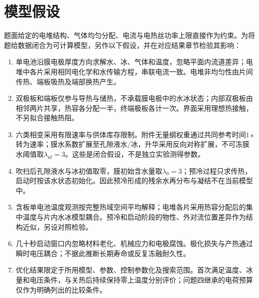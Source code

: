 \documentclass[bwprint]{gmcmthesis}
\numberwithin{equation}{section}
\numberwithin{figure}{section}
\begin{document}
\section{模型假设}
题面给定的电堆结构、气体均匀分配、电流与电热丝功率上限直接作为约束。为将题给数据闭合为可计算模型，另作以下假设，并在对应结果章节检验其影响：
\begin{enumerate}
\item 单电池沿膜电极厚度方向求解水、冰、气体和温度，忽略平面内流道差异；电堆中各片采用相同电化学和水传输方程，串联电流一致。电堆非均匀性由片间传热、端板吸热及端部换热产生。
\item 双极板和端板仅参与导热与储热，不承载膜电极中的水冰状态；内部双极板由相邻两片共享，热容各分配一半，终端极板各计一次。界面采用理想热接触，不另拟合接触热阻。
\item 六类相变采用有限速率与供体库存限制。附件无量纲权重通过共同参考时间$1\,\mathrm s$转为速率；膜水系数扩展至孔隙液水/冰，升华采用反向对称扩展，不可冻膜水阈值取$\lambda_{\mathrm{nf}}=3$。这些是闭合假设，不是独立实验测得参数。
\item 吹扫后孔隙液水与冰初值取零，膜初始含水量取$\lambda_0=3$；预冷过程只求传热，启动时按该水状态初始化。因此预冷形成的残余水再分布与凝结不在当前模型中。
\item 含板单电池温度观测按完整热域空间平均解释；电堆各片采用热容分配后的集中温度与片内水冰模型耦合。预冷和启动阶段的物性、外对流位置差异作为结构近似，另设对照检验。
\item 几十秒启动窗口内忽略材料老化、机械应力和电极腐蚀。极化损失与产热通过瞬时电压耦合；不据此推断长期寿命或反复冻融耐久性。
\item 优化结果限定于所用模型、参数、控制参数化及搜索范围。首次满足温度、冰量和电压条件，与关热后持续保持零上温度分别评价；问题四继承的电荷预算仅作为明确列出的比较条件。
\end{enumerate}
\end{document}
